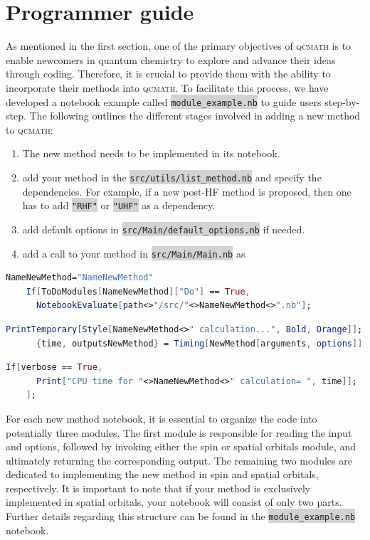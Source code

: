 \documentclass[aip,jcp,reprint,noshowkeys,superscriptaddress]{revtex4-1}
\newcommand{\qcmath}{\textsc{qcmath}\xspace}
\newcommand{\keyword}[1]{{\colorbox{lightgray}{\texttt{#1}}}}
\begin{document}
\section{Programmer guide}
As mentioned in the first section, one of the primary objectives of \qcmath is to enable newcomers in quantum chemistry to explore and advance their ideas through coding. Therefore, it is crucial to provide them with the ability to incorporate their methods into \qcmath. To facilitate this process, we have developed a notebook example called \keyword{module\_example.nb} to guide users step-by-step. The following outlines the different stages involved in adding a new method to \qcmath:
\begin{enumerate}
	\item The new method needs to be implemented in its notebook.
	\item add your method in the \keyword{src/utils/list\_method.nb} and specify the dependencies. For example, if a new post-HF method is proposed, then one has to add \keyword{"RHF"} or \keyword{"UHF"} as a dependency.
	\item add default options in \keyword{src/Main/default\_options.nb} if needed.
	\item add a call to your method in \keyword{src/Main/Main.nb} as
\end{enumerate}
\begin{lstlisting}[extendedchars=true,language=Mathematica]
	NameNewMethod="NameNewMethod"
	If[ToDoModules[NameNewMethod]["Do"] == True,
	  NotebookEvaluate[path<>"/src/"<>NameNewMethod<>".nb"];
\end{lstlisting}
\begin{lstlisting}[extendedchars=true,language=Mathematica]
	PrintTemporary[Style[NameNewMethod<>" calculation...", Bold, Orange]];
	  {time, outputsNewMethod} = Timing[NewMethod[arguments, options]];	
\end{lstlisting}
\begin{lstlisting}[extendedchars=true,language=Mathematica]
	If[verbose == True, 
	  Print["CPU time for "<>NameNewMethod<>" calculation= ", time]];
	];
\end{lstlisting}
For each new method notebook, it is essential to organize the code into potentially three modules. The first module is responsible for reading the input and options, followed by invoking either the spin or spatial orbitals module, and ultimately returning the corresponding output. The remaining two modules are dedicated to implementing the new method in spin and spatial orbitals, respectively. It is important to note that if your method is exclusively implemented in spatial orbitals, your notebook will consist of only two parts. Further details regarding this structure can be found in the \keyword{module\_example.nb} notebook.


\end{document}
